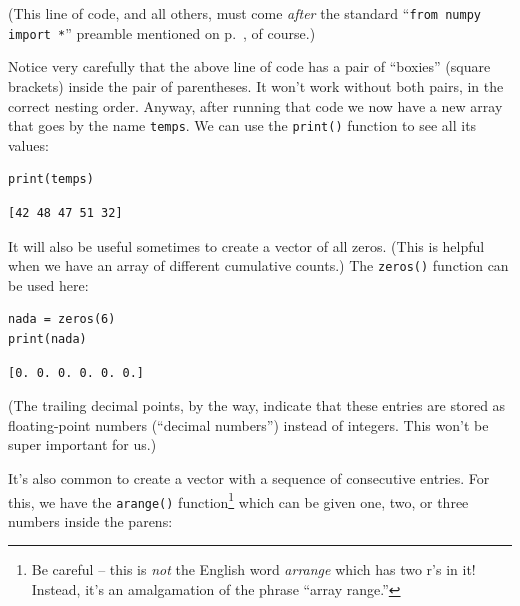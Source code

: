 
(This line of code, and all others, must come \textit{after} the standard
``\texttt{from numpy import *}'' preamble mentioned on
p.~\pageref{importNumpy}, of course.)

Notice very carefully that the above line of code has a pair of ``boxies''
(square brackets) inside the pair of parentheses. It won't work without both
pairs, in the correct nesting order. Anyway, after running that code we now
have a new array that goes by the name \texttt{temps}. We can use the
\texttt{print()} function to see all its values:

\begin{Verbatim}[fontsize=\small,samepage=true,frame=single,framesep=3mm]
print(temps)
\end{Verbatim}

\vspace{-.2in}
\begin{Verbatim}[fontsize=\small,samepage=true,frame=leftline,framesep=5mm,framerule=1mm]
[42 48 47 51 32]
\end{Verbatim}

\medskip
{}
It will also be useful sometimes to create a vector of all zeros. (This is
helpful when we have an array of different cumulative counts.) The
\texttt{zeros()} function can be used here:

\begin{Verbatim}[fontsize=\small,samepage=true,frame=single,framesep=3mm]
nada = zeros(6)
print(nada)
\end{Verbatim}
\vspace{-.2in}

\begin{Verbatim}[fontsize=\small,samepage=true,frame=leftline,framesep=5mm,framerule=1mm]
[0. 0. 0. 0. 0. 0.]
\end{Verbatim}

(The trailing decimal points, by the way, indicate that these entries are
stored as floating-point numbers (``decimal numbers'') instead of integers.
This won't be super important for us.)

\medskip
{}
\label{arange}

It's also common to create a vector with a sequence of consecutive entries. For
this, we have the \texttt{arange()} function\footnote{Be careful -- this is
\textit{not} the English word \textsl{arrange} which has two r's in it! Instead,
it's an amalgamation of the phrase ``array range.''} which can be given one,
two, or three numbers inside the parens:

